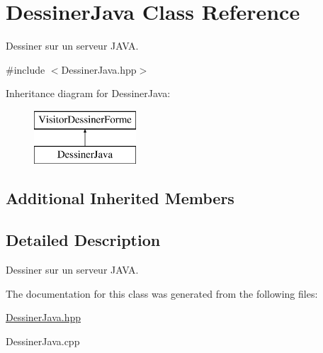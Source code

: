 \hypertarget{class_dessiner_java}{}\section{Dessiner\+Java Class Reference}
\label{class_dessiner_java}


Dessiner sur un serveur J\+A\+VA.  




{\ttfamily \#include $<$Dessiner\+Java.\+hpp$>$}

Inheritance diagram for Dessiner\+Java\+:\begin{figure}[H]
\begin{center}
\leavevmode
\includegraphics[height=2.000000cm]{class_dessiner_java}
\end{center}
\end{figure}
\subsection*{Additional Inherited Members}


\subsection{Detailed Description}
Dessiner sur un serveur J\+A\+VA. 

The documentation for this class was generated from the following files\+:\begin{DoxyCompactItemize}
\item 
\mbox{\hyperlink{_dessiner_java_8hpp}{Dessiner\+Java.\+hpp}}\item 
Dessiner\+Java.\+cpp\end{DoxyCompactItemize}
